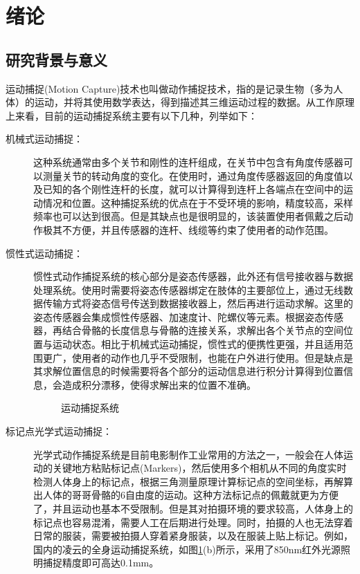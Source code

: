 
\section{绪论}

\subsection{研究背景与意义}
运动捕捉(Motion Capture)技术也叫做动作捕捉技术，指的是记录生物（多为人体）的运动，并将其使用数学表达，得到描述其三维运动过程的数据。从工作原理上来看，目前的运动捕捉系统主要有以下几种，列举如下：
\begin{description}
    \item[机械式运动捕捉：]这种系统通常由多个关节和刚性的连杆组成，在关节中包含有角度传感器可以测量关节的转动角度的变化。在使用时，通过角度传感器返回的角度值以及已知的各个刚性连杆的长度，就可以计算得到连杆上各端点在空间中的运动情况和位置。这种捕捉系统的优点在于不受环境的影响，精度较高，采样频率也可以达到很高。但是其缺点也是很明显的，该装置使用者佩戴之后动作极其不方便，并且传感器的连杆、线缆等约束了使用者的动作范围。
    \item[惯性式运动捕捉：]惯性式动作捕捉系统的核心部分是姿态传感器，此外还有信号接收器与数据处理系统。使用时需要将姿态传感器绑定在肢体的主要部位上，通过无线数据传输方式将姿态信号传送到数据接收器上，然后再进行运动求解。这里的姿态传感器会集成惯性传感器、加速度计、陀螺仪等元素。根据姿态传感器，再结合骨骼的长度信息与骨骼的连接关系，求解出各个关节点的空间位置与运动状态。相比于机械式运动捕捉，惯性式的便携性更强，并且适用范围更广，使用者的动作也几乎不受限制，也能在户外进行使用。但是缺点是其求解位置信息的时候需要将各个部分的运动信息进行积分计算得到位置信息，会造成积分漂移，使得求解出来的位置不准确。
    \begin{figure}[ht] \centering
        \caption{运动捕捉系统}
        \label{fig:motion}
    \end{figure} 
    \item[标记点光学式运动捕捉：]光学式动作捕捉系统是目前电影制作工业常用的方法之一，一般会在人体运动的关键地方粘贴标记点(Markers)，然后使用多个相机从不同的角度实时检测人体身上的标记点，根据三角测量原理计算标记点的空间坐标，再解算出人体的哥哥骨骼的6自由度的运动。这种方法标记点的佩戴就更为方便了，并且运动也基本不受限制。但是其对拍摄环境的要求较高，人体身上的标记点也容易混淆，需要人工在后期进行处理。同时，拍摄的人也无法穿着日常的服装，需要被拍摄人穿着紧身服装，以及在服装上贴上标记。例如，国内的凌云\cite{lingyun}的全身运动捕捉系统，如图\ref{fig:motion}(b)所示，采用了850nm红外光源照明捕捉精度即可高达0.1mm。 

\end{description}
